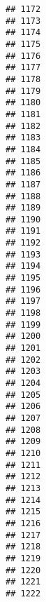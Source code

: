 \documentclass[
]{article}
\begin{document}
\begin{verbatim}
## 1172                                           
## 1173                                           
## 1174                                           
## 1175                                           
## 1176                                           
## 1177                                           
## 1178                                           
## 1179                                           
## 1180                                           
## 1181                                           
## 1182                                           
## 1183                                           
## 1184                                           
## 1185                                           
## 1186                                           
## 1187                                           
## 1188                                           
## 1189                                           
## 1190                                           
## 1191                                           
## 1192                                           
## 1193                                           
## 1194                                           
## 1195                                           
## 1196                                           
## 1197                                           
## 1198                                           
## 1199                                           
## 1200                                           
## 1201                                           
## 1202                                           
## 1203                                           
## 1204                                           
## 1205                                           
## 1206                                           
## 1207                                           
## 1208                                           
## 1209                                           
## 1210                                           
## 1211                                           
## 1212                                           
## 1213                                           
## 1214                                           
## 1215                                           
## 1216                                           
## 1217                                           
## 1218                                           
## 1219                                           
## 1220                                           
## 1221                                           
## 1222                                           

\end{verbatim}
\end{document}
